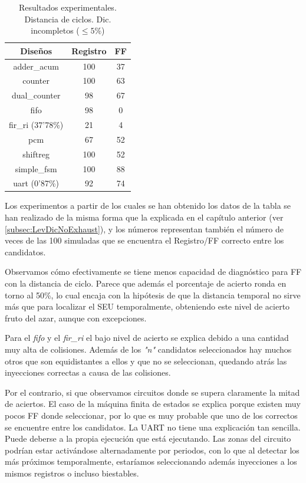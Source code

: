 \begin{table}[htbp]
    \ttabbox
    {\caption{Resultados experimentales. Distancia de ciclos. Dic.
    incompletos ($\leq5\%$)}
    \label{tab:CycleRes}}
    {
        \begin{tabular}{c|c c}
            \hline
            \rule[-8pt]{0pt}{22pt}{\bfseries{Diseños}}&{\bfseries{Registro}}
            &{\bfseries{\gls{FF}}} \\
            \hline
            \rule{0pt}{14pt}adder\_acum & 100 & 37\\
            counter & 100 & 63\\
            dual\_counter & 98 & 67\\
            fifo & 98 & 0\\
            fir\_ri (37'78\%) & 21 & 4\\
            pcm & 67 & 52\\
            shiftreg & 100 & 52\\
            simple\_fsm & 100 & 88\\
            uart (0'87\%) & 92 & 74\\
            \hline
        \end{tabular}
    }
\end{table}

Los experimentos a partir de los cuales se han obtenido los datos de la tabla se
han realizado de la misma forma que la explicada en el capítulo anterior
(ver \ref{subsec:LevDicNoExhaust}), y los números representan también el número de
veces de las 100 simuladas que se encuentra el Registro/FF correcto entre los
candidatos.

Observamos cómo efectivamente se tiene menos capacidad de diagnóstico para 
\gls{FF} con la distancia de ciclo. Parece que además el porcentaje de acierto
ronda en torno al 50\%, lo cual encaja con la hipótesis de que la distancia
temporal no sirve más que para localizar el \gls{SEU} temporalmente, obteniendo
este nivel de acierto fruto del azar, aunque con excepciones.

Para el \textit{fifo} y el \textit{fir\_ri} el bajo nivel de acierto se explica
debido a una cantidad muy alta de colisiones. Además de los \textit{"n"} 
candidatos seleccionados hay muchos otros que son equidistantes a ellos y que no
se seleccionan, quedando atrás las inyecciones correctas a causa de las
colisiones.

Por el contrario, si que observamos circuitos donde se supera claramente la mitad
de aciertos. El caso de la máquina finita de estados se explica porque existen muy
pocos \gls{FF} donde seleccionar, por lo que es muy probable que uno de los
correctos se encuentre entre los candidatos. La \gls{UART} no tiene una
explicación tan sencilla. Puede deberse a la propia ejecución que está ejecutando.
Las zonas del circuito podrían estar activándose alternadamente por periodos, con
lo que al detectar los más próximos temporalmente, estaríamos seleccionando además
inyecciones a los mismos registros o incluso biestables.

\endinput
